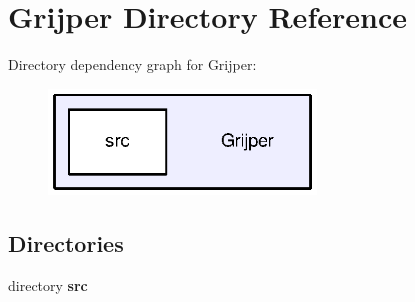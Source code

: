 \section{Grijper Directory Reference}
\label{dir_be77a52a37d1299814455a6bb655fedb}
Directory dependency graph for Grijper\-:
\nopagebreak
\begin{figure}[H]
\begin{center}
\leavevmode
\includegraphics[width=202pt]{dir_be77a52a37d1299814455a6bb655fedb_dep}
\end{center}
\end{figure}
\subsection*{Directories}
\begin{DoxyCompactItemize}
\item 
directory {\bf src}
\end{DoxyCompactItemize}
